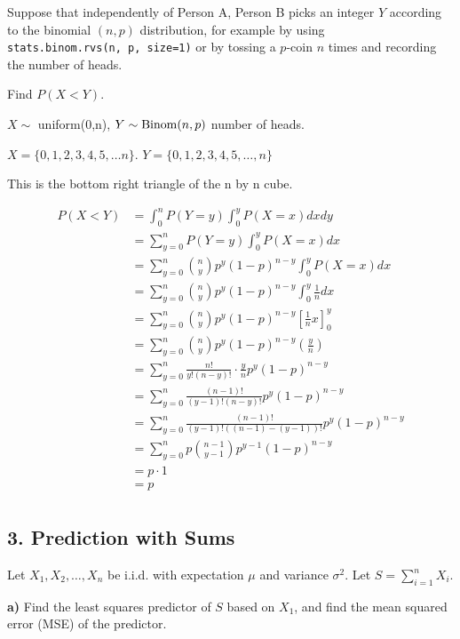 \documentclass[11pt]{article}
\begin{document}
Suppose that independently of Person A, Person B picks an integer \(Y\)
according to the binomial \((n, p)\) distribution, for example by using
\texttt{stats.binom.rvs(n,\ p,\ size=1)} or by tossing a \(p\)-coin
\(n\) times and recording the number of heads.

Find \(P(X < Y)\).


$X \sim $ uniform(0,n), $Y \sim \operatorname{Binom}(n, p)$ number of heads. 

$X = \{0,1,2,3,4,5,\dots n\}$. $Y = \{0,1,2,3,4,5,\dots, n\}$ 


This is the bottom right triangle of the n by n cube. 



\begin{align*}
	P(X < Y) &= \int_{0}^{n} P(Y=y)\int_{0}^{y} P(X=x) dxdy \\
	&= \sum_{y=0}^{n} P(Y=y) \int_{0}^{y} P(X=x) dx \\
&=  	\sum_{y=0}^{n} \binom{n}{y} p^{y}(1-p)^{n-y} \int_{0}^{y}P(X=x)dx\\
&= \sum_{y=0}^{n} \binom{n}{y}p^{y}(1-p)^{n-y} \int_{0}^{y}\frac{1}{n}dx \\
&= \sum_{y=0}^{n} \binom{n}{y} p^{y}(1-p)^{n-y} \left[ \frac{1}{n}x \right]_{0}^{y} \\
&= \sum_{y=0}^{n} \binom{n}{y} p^{y}(1-p)^{n-y} \left( \frac{y}{n} \right)  \\
&= \sum_{y=0}^{n} \frac{n!}{y!(n-y)!} \cdot \frac{y}{n} p^{y}(1-p)^{n-y} \\
&= \sum_{y=0}^{n}\frac{(n-1)!}{(y-1)!(n-y)!} p^{y}(1-p)^{n-y} \\
&= \sum_{y=0}^{n} \frac{(n-1)!}{(y-1)!( (n-1) - (y-1))!} p^{y}(1-p)^{n-y}  \\
&= \sum_{y=0}^{n} p \binom{n-1}{y-1} p^{y-1} (1-p)^{n-y} \\
&= p \cdot 1 \\
&= p \\
\end{align*}
    \newpage

    \hypertarget{prediction-with-sums}{%
\subsection{3. Prediction with Sums}\label{prediction-with-sums}}

Let \(X_1, X_2, \ldots, X_n\) be i.i.d. with expectation \(\mu\) and
variance \(\sigma^2\). Let \(S = \sum_{i=1}^n X_i\).

\textbf{a)} Find the least squares predictor of \(S\) based on \(X_1\),
and find the mean squared error (MSE) of the predictor.
\end{document}

